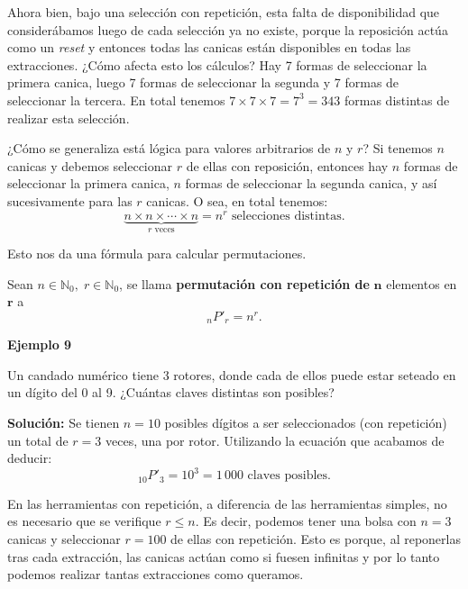 \documentclass[
  letterpaper,
  DIV=11,
  numbers=noendperiod]{scrreprt}
\begin{document}
Ahora bien, bajo una selección con repetición, esta falta de
disponibilidad que considerábamos luego de cada selección ya no existe,
porque la reposición actúa como un \emph{reset} y entonces todas las
canicas están disponibles en todas las extracciones. ¿Cómo afecta esto
los cálculos? Hay 7 formas de seleccionar la primera canica, luego 7
formas de seleccionar la segunda y 7 formas de seleccionar la tercera.
En total tenemos \(7 \times 7 \times 7 = 7^3 = 343\) formas distintas de
realizar esta selección.

¿Cómo se generaliza está lógica para valores arbitrarios de \(n\) y
\(r\)? Si tenemos \(n\) canicas y debemos seleccionar \(r\) de ellas con
reposición, entonces hay \(n\) formas de seleccionar la primera canica,
\(n\) formas de seleccionar la segunda canica, y así sucesivamente para
las \(r\) canicas. O sea, en total tenemos:
\[ \underbrace{n \times n \times \cdots \times n}_\text{$r$ veces} = n^r \text{ selecciones distintas.} \]

Esto nos da una fórmula para calcular permutaciones.

Sean \(n \in \mathbb{N}_0, \; r \in \mathbb{N}_0\), se llama
\textbf{permutación con repetición de} \(\mathbf{n}\) elementos en
\(\mathbf{r}\) a \[_nP'_r = n^r.\]

\begin{examplebox}

\begin{center}
\textbf{Ejemplo 9}

\end{center}

Un candado numérico tiene 3 rotores, donde cada de ellos puede estar
seteado en un dígito del 0 al 9. ¿Cuántas claves distintas son posibles?

\textbf{Solución:} Se tienen \(n=10\) posibles dígitos a ser
seleccionados (con repetición) un total de \(r=3\) veces, una por rotor.
Utilizando la ecuación que acabamos de deducir:
\[_{10}P'_3 = 10^3 = 1\,000 \text{ claves posibles.}\]

\end{examplebox}

En las herramientas con repetición, a diferencia de las herramientas
simples, no es necesario que se verifique \(r \leq n\). Es decir,
podemos tener una bolsa con \(n=3\) canicas y seleccionar \(r=100\) de
ellas con repetición. Esto es porque, al reponerlas tras cada
extracción, las canicas actúan como si fuesen infinitas y por lo tanto
podemos realizar tantas extracciones como queramos.
\end{document}
